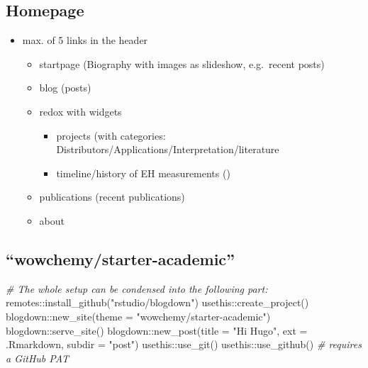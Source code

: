 \documentclass[
]{article}
\newenvironment{Shaded}{\begin{snugshade}}{\end{snugshade}}
\newcommand{\AttributeTok}[1]{\textcolor[rgb]{0.77,0.63,0.00}{#1}}
\newcommand{\CommentTok}[1]{\textcolor[rgb]{0.56,0.35,0.01}{\textit{#1}}}
\newcommand{\FunctionTok}[1]{\textcolor[rgb]{0.00,0.00,0.00}{#1}}
\newcommand{\NormalTok}[1]{#1}
\newcommand{\SpecialCharTok}[1]{\textcolor[rgb]{0.00,0.00,0.00}{#1}}
\newcommand{\StringTok}[1]{\textcolor[rgb]{0.31,0.60,0.02}{#1}}
\providecommand{\tightlist}{%
  \setlength{\itemsep}{0pt}\setlength{\parskip}{0pt}}
\begin{document}
\hypertarget{homepage}{%
\subsection{Homepage}\label{homepage}}

\begin{itemize}
\item
  max. of 5 links in the header

  \begin{itemize}
  \item
    startpage (Biography with images as slideshow, e.g.~recent
    posts)
  \item
    blog (posts)
  \item
    redox with widgets

    \begin{itemize}
    \tightlist
    \item
      projects (with categories:
      Distributors/Applications/Interpretation/literature
    \item
      timeline/history of EH measurements ()
    \end{itemize}
  \item
    publications (recent publications)
  \item
    about
  \end{itemize}
\end{itemize}

\hypertarget{wowchemystarter-academic}{%
\subsection{``wowchemy/starter-academic''}\label{wowchemystarter-academic}}

\begin{Shaded}
\begin{Highlighting}[]

\CommentTok{\# The whole setup can be condensed into the following part:}
\NormalTok{remotes}\SpecialCharTok{::}\FunctionTok{install\_github}\NormalTok{(}\StringTok{"rstudio/blogdown"}\NormalTok{)}
\NormalTok{usethis}\SpecialCharTok{::}\FunctionTok{create\_project}\NormalTok{()}
\NormalTok{blogdown}\SpecialCharTok{::}\FunctionTok{new\_site}\NormalTok{(}\AttributeTok{theme =} \StringTok{"wowchemy/starter{-}academic"}\NormalTok{)}
\NormalTok{blogdown}\SpecialCharTok{::}\FunctionTok{serve\_site}\NormalTok{()}
\NormalTok{blogdown}\SpecialCharTok{::}\FunctionTok{new\_post}\NormalTok{(}\AttributeTok{title =} \StringTok{"Hi Hugo"}\NormalTok{, }
                     \AttributeTok{ext =} \StringTok{\textquotesingle{}.Rmarkdown\textquotesingle{}}\NormalTok{, }
                     \AttributeTok{subdir =} \StringTok{"post"}\NormalTok{)}
\NormalTok{usethis}\SpecialCharTok{::}\FunctionTok{use\_git}\NormalTok{()}
\NormalTok{usethis}\SpecialCharTok{::}\FunctionTok{use\_github}\NormalTok{() }\CommentTok{\# requires a GitHub PAT}
\end{Highlighting}
\end{Shaded}
\end{document}

